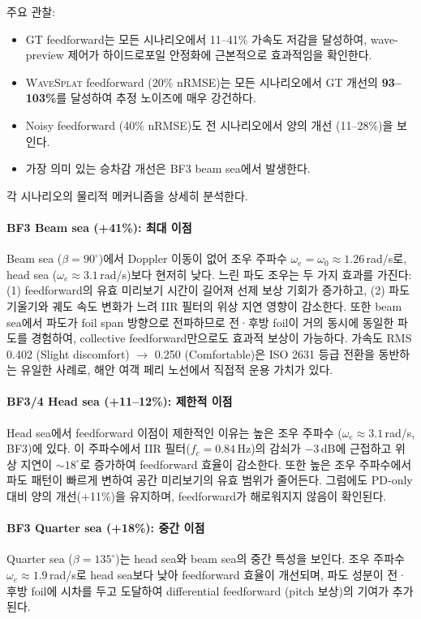 \documentclass[11pt]{report}
\numberwithin{equation}{chapter}
\numberwithin{figure}{chapter}
\numberwithin{table}{chapter}
\newcommand{\WS}{\textsc{WaveSplat}}
\begin{document}
주요 관찰:
\begin{itemize}
  \item GT feedforward는 모든 시나리오에서 11--41\% 가속도 저감을 달성하여,
        wave-preview 제어가 하이드로포일 안정화에 근본적으로 효과적임을 확인한다.
  \item \WS{} feedforward (20\% nRMSE)는 모든 시나리오에서 GT 개선의
        \textbf{93--103\%}를 달성하여 추정 노이즈에 매우 강건하다.
  \item Noisy feedforward (40\% nRMSE)도 전 시나리오에서 양의 개선 (11--28\%)을 보인다.
  \item 가장 의미 있는 승차감 개선은 BF3 beam sea에서 발생한다.
\end{itemize}

각 시나리오의 물리적 메커니즘을 상세히 분석한다.

\paragraph{BF3 Beam sea (+41\%): 최대 이점}
Beam sea ($\beta = 90^\circ$)에서 Doppler 이동이 없어
조우 주파수 $\omega_e = \omega_0 \approx 1.26$\,rad/s로,
head sea ($\omega_e \approx 3.1$\,rad/s)보다 현저히 낮다.
느린 파도 조우는 두 가지 효과를 가진다:
(1) feedforward의 유효 미리보기 시간이 길어져 선제 보상 기회가 증가하고,
(2) 파도 기울기와 궤도 속도 변화가 느려 IIR 필터의 위상 지연 영향이 감소한다.
또한 beam sea에서 파도가 foil span 방향으로 전파하므로
전·후방 foil이 거의 동시에 동일한 파도를 경험하여,
collective feedforward만으로도 효과적 보상이 가능하다.
가속도 RMS 0.402 (Slight discomfort) $\to$ 0.250 (Comfortable)은
ISO 2631 등급 전환을 동반하는 유일한 사례로,
해안 여객 페리 노선에서 직접적 운용 가치가 있다.

\paragraph{BF3/4 Head sea (+11--12\%): 제한적 이점}
Head sea에서 feedforward 이점이 제한적인 이유는 높은 조우 주파수
($\omega_e \approx 3.1$\,rad/s, BF3)에 있다.
이 주파수에서 IIR 필터($f_c = 0.84$\,Hz)의 감쇠가 $-3$\,dB에 근접하고
위상 지연이 $\sim 18^\circ$로 증가하여 feedforward 효율이 감소한다.
또한 높은 조우 주파수에서 파도 패턴이 빠르게 변하여
공간 미리보기의 유효 범위가 줄어든다.
그럼에도 PD-only 대비 양의 개선(+11\%)을 유지하며,
feedforward가 해로워지지 않음이 확인된다.

\paragraph{BF3 Quarter sea (+18\%): 중간 이점}
Quarter sea ($\beta = 135^\circ$)는 head sea와 beam sea의 중간 특성을 보인다.
조우 주파수 $\omega_e \approx 1.9$\,rad/s로 head sea보다 낮아
feedforward 효율이 개선되며, 파도 성분이 전·후방 foil에 시차를 두고
도달하여 differential feedforward (pitch 보상)의 기여가 추가된다.
\end{document}
